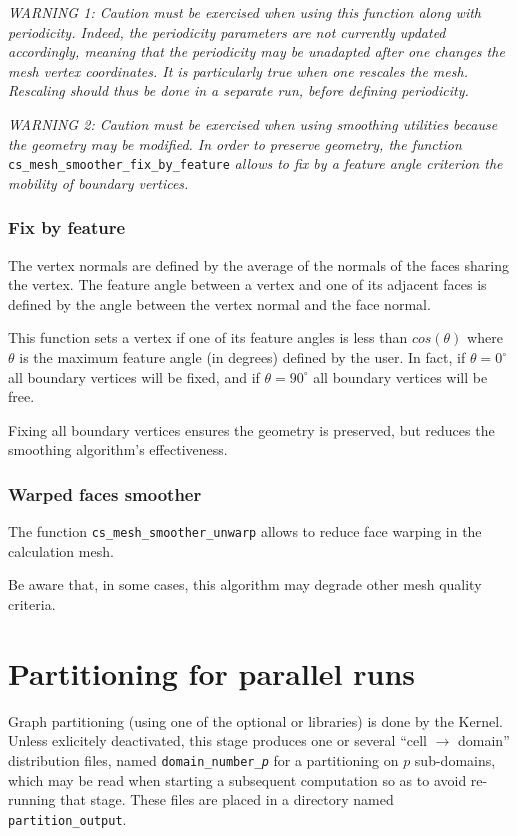 {{{\em WARNING 1: Caution must be exercised when using this function
along with periodicity. Indeed, the periodicity parameters are not
currently updated accordingly, meaning that the periodicity may be
unadapted after one changes the mesh vertex coordinates. It is particularly
true when one rescales the mesh. Rescaling should thus be done
in a separate run, before defining periodicity.}

{\em WARNING 2: Caution must be exercised when using smoothing utilities
because the geometry may be modified. In order to preserve geometry,
the function} \texttt{cs\_mesh\_smoother\_fix\_by\_feature} {\em allows to 
fix by a feature angle criterion the mobility of boundary vertices.}

\subsubsection{Fix by feature}
The vertex normals are defined by the average of the normals of the
faces sharing the vertex.
The feature angle between a vertex and one of its adjacent faces is defined
by the angle between the vertex normal and the face normal.

This function sets a vertex if one of its feature angles is less than
$cos(\theta)$ where $\theta$ is the maximum feature angle (in degrees)
defined by the user.
In fact, if $\theta = 0^{\circ}$ all boundary vertices will be fixed, and 
if $\theta = 90^{\circ}$ all boundary vertices will be free.

Fixing all boundary vertices ensures the geometry is preserved, but reduces
the smoothing algorithm's effectiveness.

\subsubsection{Warped faces smoother}

The function \texttt{cs\_mesh\_smoother\_unwarp} allows to reduce face warping
in the calculation mesh.

Be aware that, in some cases, this algorithm may degrade other mesh quality 
criteria.

\section{Partitioning for parallel runs\label{sec:parall:part}}

Graph partitioning (using one of the optional \metis or
\scotch libraries) is done by the Kernel. Unless exlicitely
deactivated, this stage produces one or several ``cell $\rightarrow$ domain''
distribution files, named {\tt domain\_number\_\it{p}} for a partitioning on
$p$ sub-domains, which may be read when starting a subsequent computation so as
to avoid re-running that stage. These files are placed in a directory named
{\tt partition\_output}.

}}
